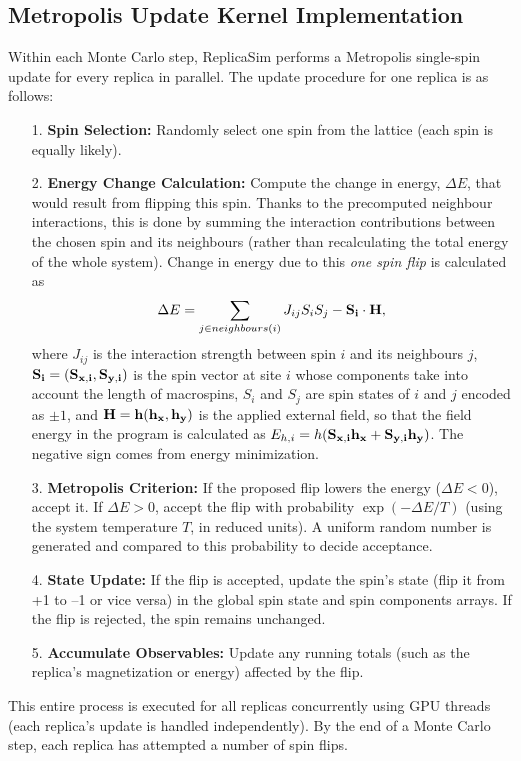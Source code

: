 \documentclass[journal=nalefd,manuscript=letter]{achemso}
\begin{document}
\subsection{Metropolis Update Kernel Implementation}
Within each Monte Carlo step, ReplicaSim performs a Metropolis single-spin update for every replica in parallel. The update procedure for one replica is as follows:
\begin{itemize}

\item[1.] \textbf{Spin Selection:} Randomly select one spin from the lattice (each spin is equally likely).
\item[2.] \textbf{Energy Change Calculation:} Compute the change in energy, $\Delta E$, that would result from flipping this spin. Thanks to the precomputed neighbour interactions, this is done by summing the interaction contributions between the chosen spin and its neighbours (rather than recalculating the total energy of the whole system). Change in energy due to this \emph{one spin flip} is calculated as
\[
\Delta E = \sum_{j\in neighbours(i)} J_{ij}S_{i}S_{j} - \bf{S_{i}}\cdot\bf{H},
\]
where $J_{ij}$ is the interaction strength between spin $i$ and its neighbours $j$, $\bf{S_{i}} = (\bf{S_{x,i}}, \bf{S_{y,i}})$ is the spin vector at site $i$ whose components take into account the length of macrospins, $S_{i}$ and $S_{j}$ are spin states of $i$ and $j$ encoded as $\pm1$, and $\bf{H} = h(\bf{h_{x}}, \bf{h_{y}})$ is the applied external field, so that the field energy in the program is calculated as $E_{h,i} = h(\bf{S_{x,i}} h_{x} + \bf{S_{y,i}} h_{y})$. The negative sign comes from energy minimization.
\item[3.] \textbf{Metropolis Criterion:} If the proposed flip lowers the energy ($\Delta E < 0$), accept it. If $\Delta E > 0$, accept the flip with probability $\exp(-\Delta E/T)$ (using the system temperature $T$, in reduced units). A uniform random number is generated and compared to this probability to decide acceptance.
\item[4.] \textbf{State Update:} If the flip is accepted, update the spin’s state (flip it from +1 to –1 or vice versa) in the global spin state and spin components arrays. If the flip is rejected, the spin remains unchanged.
\item[5.] \textbf{Accumulate Observables:} Update any running totals (such as the replica’s magnetization or energy) affected by the flip.

\end{itemize}
This entire process is executed for all replicas concurrently using GPU threads (each replica’s update is handled independently). By the end of a Monte Carlo step, each replica has attempted a number of spin flips.
\end{document}
